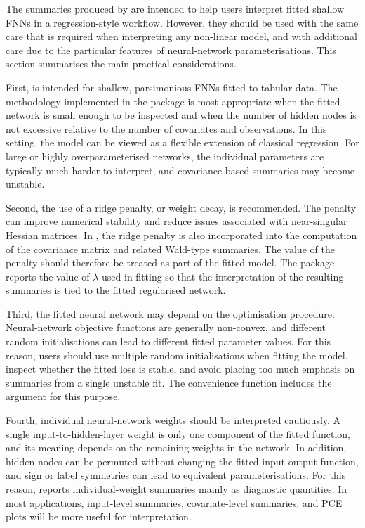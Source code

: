 The summaries produced by  are intended to help users interpret fitted shallow FNNs in a regression-style workflow.
However, they should be used with the same care that is required when interpreting any non-linear model, and with additional care due to the particular features of neural-network parameterisations.
This section summarises the main practical considerations.

First,  is intended for shallow, parsimonious FNNs fitted to tabular data.
The methodology implemented in the package is most appropriate when the fitted network is small enough to be inspected and when the number of hidden nodes is not excessive relative to the number of covariates and observations.
In this setting, the model can be viewed as a flexible extension of classical regression.
For large or highly overparameterised networks, the individual parameters are typically much harder to interpret, and covariance-based summaries may become unstable.

Second, the use of a ridge penalty, or weight decay, is recommended.
The penalty can improve numerical stability and reduce issues associated with near-singular Hessian matrices.
In , the ridge penalty is also incorporated into the computation of the covariance matrix and related Wald-type summaries.
The value of the penalty should therefore be treated as part of the fitted model.
The package reports the value of \(\lambda\) used in fitting so that the interpretation of the resulting summaries is tied to the fitted regularised network.

Third, the fitted neural network may depend on the optimisation procedure.
Neural-network objective functions are generally non-convex, and different random initialisations can lead to different fitted parameter values.
For this reason, users should use multiple random initialisations when fitting the model, inspect whether the fitted loss is stable, and avoid placing too much emphasis on summaries from a single unstable fit.
The convenience function  includes the argument  for this purpose.

Fourth, individual neural-network weights should be interpreted cautiously.
A single input-to-hidden-layer weight is only one component of the fitted function, and its meaning depends on the remaining weights in the network.
In addition, hidden nodes can be permuted without changing the fitted input-output function, and sign or label symmetries can lead to equivalent parameterisations.
For this reason,  reports individual-weight summaries mainly as diagnostic quantities.
In most applications, input-level summaries, covariate-level summaries, and PCE plots will be more useful for interpretation.

